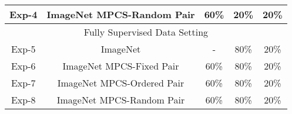 \documentclass[conference]{IEEEtran}
\begin{document}
\begin{table}[t]
{\begin{tabular}{ccccc}
\multicolumn{1}{c|}{Exp-4}                      & \multicolumn{1}{c|}{ImageNet  MPCS-Random Pair}  & \multicolumn{1}{c|}{60\%}                                                                                  & \multicolumn{1}{c|}{20\%}                                & 20\%                               \\ \hline
\multicolumn{5}{c}{Fully Supervised Data Setting}                                                                                                                                                                                                                                                                             \\ \hline
\multicolumn{1}{c|}{Exp-5}                      & \multicolumn{1}{c|}{ImageNet}                                      & \multicolumn{1}{c|}{-}                                                                                     & \multicolumn{1}{c|}{80\%}                                & 20\%                               \\
\multicolumn{1}{c|}{Exp-6}                      & \multicolumn{1}{c|}{ImageNet  MPCS-Fixed Pair} & \multicolumn{1}{c|}{60\%}                                                                                  & \multicolumn{1}{c|}{80\%}                                & 20\%                               \\
\multicolumn{1}{c|}{Exp-7}                      & \multicolumn{1}{c|}{ImageNet  MPCS-Ordered Pair}  & \multicolumn{1}{c|}{60\%}                                                                                  & \multicolumn{1}{c|}{80\%}                                & 20\%                               \\
\multicolumn{1}{c|}{Exp-8}                      & \multicolumn{1}{c|}{ImageNet  MPCS-Random Pair}  & \multicolumn{1}{c|}{60\%}                                                                                  & \multicolumn{1}{c|}{80\%}                                & 20\%                               \\ \hline
\end{tabular}}
\vspace{-2mm}
\end{table}
\end{document}
